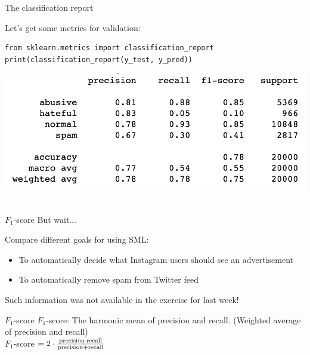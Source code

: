 \documentclass[compress]{beamer}
\begin{document}
\begin{frame}[fragile]{The classification report}
	
Let's get some metrics for validation: 
	
\begin{lstlisting}
from sklearn.metrics import classification_report
print(classification_report(y_test, y_pred))
\end{lstlisting}

\begin{center}
\includegraphics[width=\linewidth,height=\textheight,keepaspectratio]{../pictures/classification-report} \\\
\end{center}

\end{frame}


\begin{frame}{\(F_1\)-score}
But wait...

\begin{alertblock}{Compare different goals for using SML:}
\begin{itemize}
	\item To automatically decide what Instagram users should see an advertisement
	\item To automatically remove spam from Twitter feed
\end{itemize}
\end{alertblock}

Such information was not available in the exercise for last week!

\end{frame}


\begin{frame}{\(F_1\)-score}
\(F_1\)-score: The harmonic mean of precision and recall.
(Weighted average of precision and recall) \\
	
\(F_1\)-score \(= 2 \cdot \frac{\rm precision \cdot recall}{\rm precision + recall}\)
\end{frame}
\end{document}
